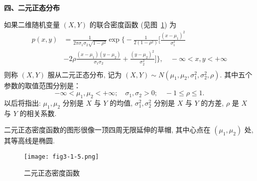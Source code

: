 \textbf{四、二元正态分布}

如果二维随机变量 $(X,Y)$ 的联合密度函数 (见图~\ref{fig:3.1.5}) 为
	\begin{equation}\label{eq:3.1.8}
	\begin{aligned} 
	p(x, y) &=\frac{1}{2 \pi \sigma_{1} \sigma_{2} \sqrt{1-\rho^{2}}} \exp \bigg\{-\frac{1}{2\left(1-\rho^{2}\right)}
	\bigg[\frac{\left(x-\mu_{1}\right)^{2}}{\sigma_{1}^{2}}		\\
	&-2 \rho \frac{\left(x-\mu_{1}\right)\left(y-\mu_{2}\right)}{\sigma_{1} \sigma_{2}}+\frac{\left(y-\mu_{2}\right)^{2}}{\sigma_{2}^{2}} 
	\bigg] \bigg\}, \quad-\infty<x, y<+\infty \\
	\end{aligned}
	\end{equation}
则称 $(X,Y)$ 服从二元正态分布, 记为 $(X,Y)\sim N(\mu_1,\mu_2,\sigma_1^2,\sigma_2^2,\rho)$. 其中五个参数的取值范围分别是：
	\[
	 	-\infty<\mu_{1}, \mu_{2}<+\infty; \quad \sigma_{1}, \sigma_{2}>0 ; \quad-1 \leq \rho \leq 1.
	\]
	以后将指出: $\mu_1,\mu_2$ 分别是 $X$ 与 $Y$ 的均值, $\sigma_1^2,\sigma_2^2$ 分别是 $X$ 与 $Y$ 的方差, $\rho$ 是
	 $X$ 与 $Y$ 的相关系数.

	 二元正态密度函数的图形很像一顶四周无限延伸的草帽, 其中心点在 $(\mu_1,\mu_2)$ 处, 其等高线是椭圆.

	 \begin{figure}[htbp]
	 	\centering
	 	\texttt{[image: fig3-1-5.png]}
	 	\caption{二元正态密度函数}\label{fig:3.1.5}
	 \end{figure}

